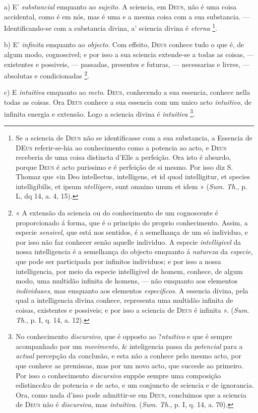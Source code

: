  a) E' \emph{substancial} emquanto ao \emph{sujeito}. A sciencia, em \textsc{Deus}, não é uma coisa accidental, como é em nós, mas é uma e a mesma coisa com a sua substancia. --- Identificando-se com a substancia divina, a' sciencia divina é \emph{eterna} \footnote{Se a sciencia de \textsc{Deus} não se identificasse com a sua substancia, a Essencia de \textsc{DEus} referir-se-hia ao conhecimento como a potencia ao acto, e \textsc{Deus} receberia de uma coisa distincta d'Elle a perfeição. Ora isto é absurdo, porque \textsc{Deus} é acto purissimo e é perfeição de si mesmo. Por isso diz S. Thomaz que «in Deo intellectus, intelligens, et id quod intelligitur, et species intelligibilis, et ipsum \emph{ntelligere}, sunt omnino unum et idem » (\emph{Sum}. \emph{Th}., p. L, dq 14, a. 4, 15).}.

b) E' \emph{infinita} emquanto ao \emph{objecto}. Com effeito, \textsc{Deus} conhece tudo o que é, de algum modo, cognoscivel; e por isso a sua sciencia extende-se a todas as coisas, --- existentes e possiveis, --- passadas, presentes e futuras, --- necessarias e livres, --- absolutas e condicionadas \footnote{« A extensão da sciencia ou do conhecimento de um cognoscente é proporcionado á forma, que é o principio do proprio conhecimento. Assim, a especie \emph{sensivel}, que está nos sentidos, é a semelhança de um só individuo, e por isso não faz conhecer senão aquelle individuo. A especie \emph{intelligivel} da nossa intelligencia é a semelhança do objecto emquanto á \emph{natureza} da \emph{especie}, que pode ser participada por infinitos individuos; e por isso a nossa intelligencia, por meio da especie intelligivel de homem, conhece, de algum modo, uma multidão infinita de homens, --- não emquanto aos elementos \emph{individuaes}, mas emquanto aos elementos \emph{especificos}. A essencia divina, pela qual a intelligencia divina conhece, representa uma multidão infinita de coisas, existentes e possiveis; e por isso a sciencia de \textsc{Deus} é infinita ». (\emph{Sum}. \emph{Th}., p. I, q. 14, a. 12).}.

c) E \emph{intuitiva} emquanto ao \emph{meto}. \textsc{Deus}, conhecendo a sua essencia, conhece nella todas as coisas. Ora \textsc{Deus} conhece a sua essencia com um unico acto \emph{intuitivo}, de infinita energia e extensão. Logo a sciencia divina é \emph{intuitiva} \footnote{No conhecimento \emph{discursivo}, que é opposto ao ?\emph{ntuitivo} e que é sempre acompanhado por um \emph{movimento}, \& inteligencia passa da \emph{potencial} para a \emph{actual} percepção da conclusão, e esta não a conhece pelo mesmo acto, por que conhece as premissas, mas por um novo acto, que succede ao primeiro. Por isso o conhecimento \emph{discursivo} suppõe sempre uma composição edistincc\&o de potencia e de acto, e um conjuncto de sciencia e de ignorancia. Ora, como nada d'isso pode admittir-se em \textsc{Deus}, concluimos que a sciencia de \textsc{Deus} não é \emph{discursiva}, mas \emph{intuitiva}. (\emph{Sum}. \emph{Th}., p. I, q. 14, a. 70).}.

